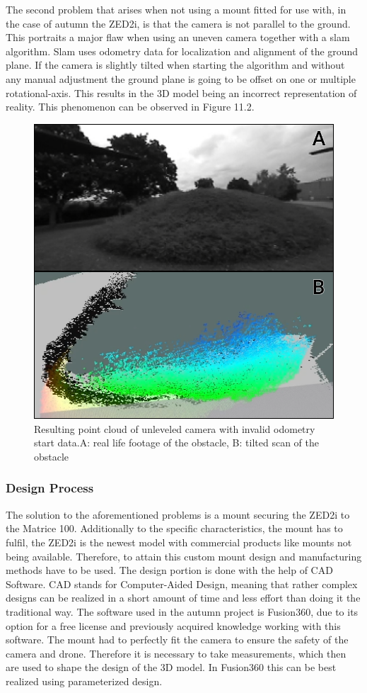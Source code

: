 The second problem that arises when not using a mount fitted for use with, in the case of autumn the ZED2i, is that the camera is not parallel to the ground. This portraits a major flaw when using an uneven camera together with a slam algorithm. Slam uses odometry data for localization and alignment of the ground plane. If the camera is slightly tilted when starting the algorithm and without any manual adjustment the ground plane is going to be offset on one or multiple rotational-axis. This results in the 3D model being an incorrect representation of reality. This phenomenon can be observed in Figure 11.2.

\begin{figure}[h]
	\centering
	\includegraphics[width=0.5\linewidth]{img/MisalignedOdom}
	\caption{Resulting point cloud of unleveled camera with invalid odometry start data.\newline A: real life footage of the obstacle, B: tilted scan of the obstacle}
	\label{fig:custom_parts_misalignedOdom}
\end{figure}

\subsubsection{Design Process}

The solution to the aforementioned problems is a mount securing the ZED2i to the Matrice 100. Additionally to the specific characteristics, the mount has to fulfil, the ZED2i is the newest model with commercial products like mounts not being available. Therefore, to attain this custom mount design and manufacturing methods have to be used. 
The design portion is done with the help of CAD Software. CAD stands for Computer-Aided Design, meaning that rather complex designs can be realized in a short amount of time and less effort than doing it the traditional way. The software used in the autumn project is Fusion360, due to its option for a free license and previously acquired knowledge working with this software. 
The mount had to perfectly fit the camera to ensure the safety of the camera and drone. Therefore it is necessary to take measurements, which then are used to shape the design of the 3D model. In Fusion360 this can be best realized using parameterized design.

